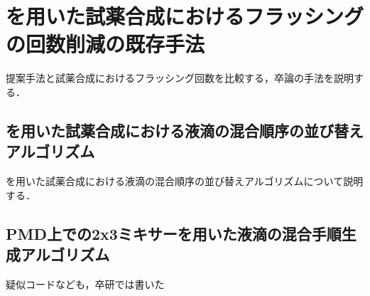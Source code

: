 \chapter{を用いた試薬合成におけるフラッシングの回数削減の既存手法}
提案手法と試薬合成におけるフラッシング回数を比較する，卒論の手法を説明する．
\section{を用いた試薬合成における液滴の混合順序の並び替えアルゴリズム}
を用いた試薬合成における液滴の混合順序の並び替えアルゴリズムについて説明する．
\section{PMD上での2x3ミキサーを用いた液滴の混合手順生成アルゴリズム}
疑似コードなども，卒研では書いた
